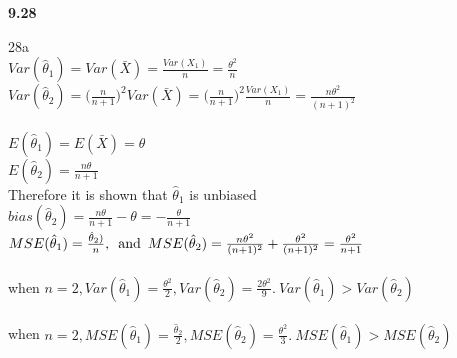 {\bf 9.28}

{28a}\\

$Var(\hat{\theta}_1) = Var(\bar{X}) = \frac{Var(X_1)}{n} = \frac{\theta ^2}{n}$\\

$Var(\hat{\theta}_2) = \Big( \frac{n}{n+1} \Big)^2 Var(\bar{X}) = \Big( \frac{n}{n+1} \Big)^2 \frac{Var(X_1)}{n} = \frac{n\theta^2}{(n+1)^2}$\\

\\

$E(\hat{\theta}_1) = E(\bar{X}) = \theta$\\

$E(\hat{\theta}_2) = \frac{n\theta}{n+1}$\\

Therefore it is shown that $\hat{\theta}_1$ is unbiased\\

$bias(\hat{\theta}_2) = \frac{n\theta}{n+1} - \theta = -\frac{\theta}{n+1}$\\

$MSE(\hat{\theta}_1) = \frac{\hat{\theta}_2)}{n}, \enskip \text{and} \enskip MSE(\hat{\theta}_2) = \frac{n\theta ^2}{(n+1)^2} + \frac{\theta ^2}{(n+1)^2} = \frac{\theta ^2}{n+1}$\\

\\

when $n=2, Var(\hat{\theta}_1)= \frac{\theta ^2}{2}, Var(\hat{\theta}_2)=\frac{2\theta^2}{9}. \ Var(\hat{\theta}_1)>Var(\hat{\theta}_2)$\\

\\

when $n=2, MSE(\hat{\theta}_1) = \frac{\hat{\theta}_2}{2}, MSE(\hat{\theta}_2)=\frac{\theta ^2}{3}. \  MSE(\hat{\theta}_1)>MSE(\hat{\theta}_2)$\\


